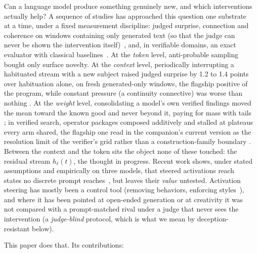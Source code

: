 \documentclass[11pt]{article}
\begin{document}
Can a language model produce something genuinely new, and which
interventions actually help? A sequence of studies has approached this
question one substrate at a time, under a fixed measurement discipline:
judged surprise, connection and coherence on windows containing only
generated text (so that the judge can never be shown the intervention
itself)~\citep{ono2026interrupting}, and, in verifiable domains, an
exact evaluator with classical baselines~\citep{ono2026mass}. At the
\emph{token} level, anti-probable sampling bought only surface novelty.
At the \emph{context} level, periodically interrupting a habituated
stream with a new subject raised judged surprise by 1.2 to 1.4 points
over habituation alone, on fresh generated-only windows, the flagship
positive of the program, while constant pressure (a continuity
connective) was worse than nothing \citep{ono2026interrupting}. At the \emph{weight} level, consolidating
a model's own verified findings moved the mean toward the known good
and never beyond it, paying for mass with tails \citep{ono2026mass};
in verified search, operator packages composed additively and stalled
at plateaus every arm shared, the flagship one read in the companion's
current version as the resolution limit of the verifier's grid rather
than a construction-family boundary \citep{ono2026operator}. Between the context and the token sits the object
none of these touched: the residual stream $h_\ell(t)$, the thought
in progress. Recent work shows, under stated assumptions and empirically on three
models, that steered activations reach states no discrete prompt
reaches~\citep{mishra2026nonsurjective}, but leaves their \emph{value}
untested. Activation steering has mostly been a control tool (removing
behaviors, enforcing
styles~\citep{turner2023actadd,panickssery2023caa,li2023iti,zou2023repe,arditi2024refusal}),
and where it has been pointed at open-ended generation or at
creativity \citep{dathathri2020pplm,olson2024creativity,schapiro2026creativityneuro}
it was not compared with a prompt-matched rival under a judge that
never sees the intervention (a \emph{judge-blind} protocol, which is
what we mean by deception-resistant below).

This paper does that. Its contributions:
\end{document}
